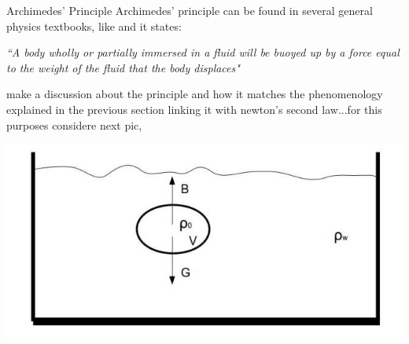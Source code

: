 \begin{section}{Archimedes' Principle}
    Archimedes' principle can be found in several general physics textbooks, like
    \cite{RESNICK} and it states: 
    
    \textit{``A body wholly or partially immersed in a fluid will be buoyed up by a 
            force equal to the weight of the fluid that the body displaces"}
    
    make a discussion about the principle and how it matches the phenomenology 
    explained in the previous section linking it with newton's second law...for this
    purposes considere next pic,
    
    \begin{center}
        \includegraphics[scale=0.4]{./pics/buoyancy.jpg}
    \end{center}
       
\end{section}
